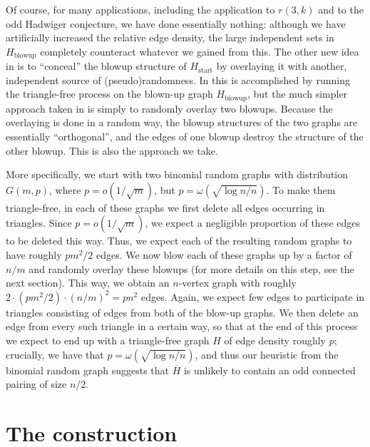 \documentclass[11pt,reqno,oneside]{amsart}
\theoremstyle{definition}
\newcommand\ol[1]{\overline{#1}}
\newcommand\1{\mathbf{1}}
\begin{document}
Of course, for many applications, including the application to $r(3,k)$ and to the odd Hadwiger conjecture, we have done essentially nothing: 
although we have artificially increased the relative edge density, the large independent sets in $H_{\mathrm{blowup}}$ completely counteract whatever we gained from this.
The other new idea in \cite{2505.13371,2511.10641,2510.19718} is to ``conceal'' the blowup structure of $H_{\mathrm{start}}$ by overlaying it with another, independent source of (pseudo)randomness. In \cite{2505.13371} this is accomplished by running the triangle-free process on the blown-up graph $H_{\mathrm{blowup}}$, but the much simpler approach taken in \cite{2510.19718,2511.10641} is simply to randomly overlay two blowups. Because the overlaying is done in a random way, the blowup structures of the two graphs are essentially ``orthogonal'', and the edges of one blowup destroy the structure of the other blowup. This is also the approach we take.

More specifically, we start with two binomial random graphs with distribution $G(m,p)$, where $p=o(1/\sqrt m)$, but $p = \omega(\sqrt{\log n/n})$. To make them triangle-free, in each of these graphs we first delete all edges occurring in triangles. Since $p=o(1/\sqrt m)$, we expect a negligible proportion of these edges to be deleted this way. Thus, we expect each of the resulting random graphs to have roughly $pm^2/2$ edges. We now blow each of these graphs up by a factor of $n/m$ and randomly overlay these blowups (for more details on this step, see the next section). This way, we obtain an $n$-vertex graph with roughly $2 \cdot (pm^2/2) \cdot (n/m)^2 = pn^2$ edges. Again, we expect few edges to participate in triangles consisting of edges from both of the blow-up graphs. We then delete an edge from every such triangle in a certain way, so that at the end of this process we expect to end up with a triangle-free graph $H$ of edge density roughly $p$; crucially, we have that $p = \omega(\sqrt{\log n/n})$, and thus our heuristic from the binomial random graph suggests that $\ol H$ is unlikely to contain an odd connected pairing of size $n/2$.

\section{The construction}\label{sec:construction}
\end{document}

